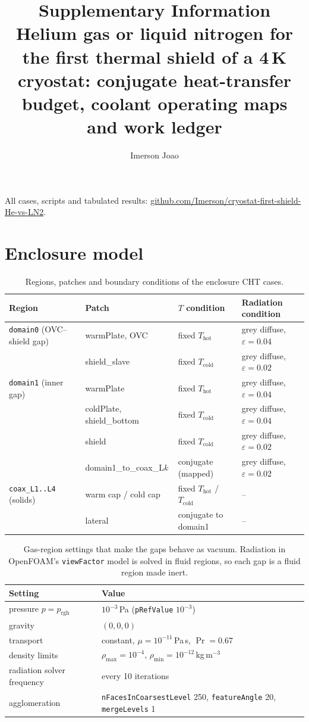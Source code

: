 \documentclass[11pt]{article}
\title{\textbf{Supplementary Information}\\[4pt]\large Helium gas or liquid nitrogen for the first thermal
shield of a 4\,K cryostat: conjugate heat-transfer budget, coolant operating maps and work ledger}
\author{Imerson Joao}\date{}
\begin{document}
\maketitle

\noindent All cases, scripts and tabulated results: \href{https://github.com/Imerson/cryostat-first-shield-He-vs-LN2}{github.com/Imerson/cryostat-first-shield-He-vs-LN2}.

\section{Enclosure model}

\begin{table}[H]\centering\small
\caption{Regions, patches and boundary conditions of the enclosure CHT cases.}
\begin{tabularx}{\textwidth}{l l l X}
\toprule
Region & Patch & $T$ condition & Radiation condition \\
\midrule
\texttt{domain0} (OVC--shield gap) & warmPlate, OVC & fixed $T_{\mathrm{hot}}$ & grey diffuse, $\varepsilon=0.04$ \\
 & shield\_slave & fixed $T_{\mathrm{cold}}$ & grey diffuse, $\varepsilon=0.02$ \\
\texttt{domain1} (inner gap) & warmPlate & fixed $T_{\mathrm{hot}}$ & grey diffuse, $\varepsilon=0.04$ \\
 & coldPlate, shield\_bottom & fixed $T_{\mathrm{cold}}$ & grey diffuse, $\varepsilon=0.04$ \\
 & shield & fixed $T_{\mathrm{cold}}$ & grey diffuse, $\varepsilon=0.02$ \\
 & domain1\_to\_coax\_L$k$ & conjugate (mapped) & grey diffuse, $\varepsilon=0.02$ \\
\texttt{coax\_L1..L4} (solids) & warm cap / cold cap & fixed $T_{\mathrm{hot}}$ / $T_{\mathrm{cold}}$ & -- \\
 & lateral & conjugate to domain1 & -- \\
\bottomrule
\end{tabularx}\end{table}

\begin{table}[H]\centering\small
\caption{Gas-region settings that make the gaps behave as vacuum. Radiation in OpenFOAM's
\texttt{viewFactor} model is solved in fluid regions, so each gap is a fluid region made inert.}
\begin{tabular}{l l}
\toprule
Setting & Value \\
\midrule
pressure $p=p_{\mathrm{rgh}}$ & $10^{-3}$\,Pa (\texttt{pRefValue} $10^{-3}$) \\
gravity & $(0,0,0)$ \\
transport & constant, $\mu=10^{-11}$\,Pa\,s, $\Pr=0.67$ \\
density limits & $\rho_{\max}=10^{-4}$, $\rho_{\min}=10^{-12}$\,kg\,m$^{-3}$ \\
radiation solver frequency & every 10 iterations \\
agglomeration & \texttt{nFacesInCoarsestLevel} 250, \texttt{featureAngle} 20, \texttt{mergeLevels} 1 \\
\bottomrule
\end{tabular}\end{table}
\end{document}
